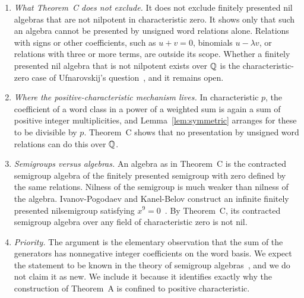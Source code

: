 \begin{remark}
\begin{enumerate}[label=(\arabic*),leftmargin=*]
\item \emph{What Theorem~C does not exclude.} It does not exclude finitely presented nil algebras that are not nilpotent
  in characteristic zero. It shows only that such an algebra cannot be presented by unsigned word relations alone.
  Relations with signs or other coefficients, such as $u+v=0$, binomials $u-\lambda v$, or relations with three or more
  terms, are outside its scope. Whether a finitely presented nil algebra that is not nilpotent exists over $\mathbb Q$ is the
  characteristic-zero case of Ufnarovskij's question~\cite[Question~8.1]{Smoktunowicz2008}, and it remains open.
\item \emph{Where the positive-characteristic mechanism lives.} In characteristic $p$, the coefficient of a word class in
  a power of a weighted sum is again a sum of positive integer multiplicities, and Lemma~\ref{lem:symmetric} arranges for
  these to be divisible by $p$. Theorem~C shows that no presentation by unsigned word relations can do this over $\mathbb Q$.
\item \emph{Semigroups versus algebras.} An algebra as in Theorem~C is the contracted semigroup algebra of the finitely
  presented semigroup with zero defined by the same relations. Nilness of the semigroup is much weaker than nilness of
  the algebra. Ivanov-Pogodaev and Kanel-Belov construct an infinite finitely presented nilsemigroup satisfying
  $x^9=0$~\cite{IvanovPogodaevKanelBelov2025}. By Theorem~C, its contracted semigroup algebra over any field of
  characteristic zero is not nil.
\item \emph{Priority.} The argument is the elementary observation that the sum of the generators has nonnegative
  integer coefficients on the word basis. We expect the statement to be known in the theory of semigroup
  algebras~\cite{Okninski1991}, and we do not claim it as new. We include it because it identifies exactly why the
  construction of Theorem~A is confined to positive characteristic.
\end{enumerate}
\end{remark}
